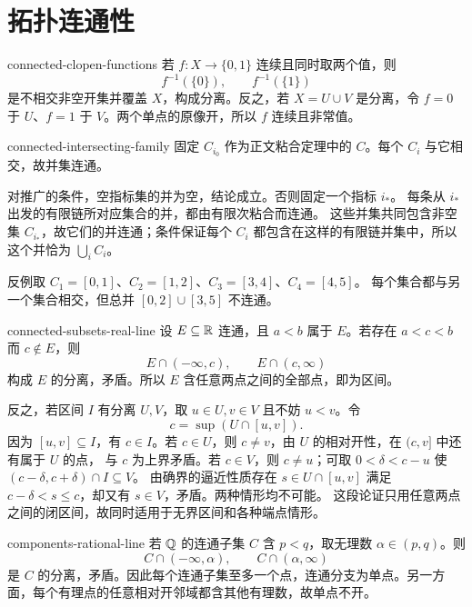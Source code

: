 \chapter{拓扑连通性}
\label{chap:topological-connectedness-solutions}

\begin{solution}{connected-clopen-functions}
若 \(f:X\to\{0,1\}\) 连续且同时取两个值，则
\[
 f^{-1}(\{0\}),\qquad f^{-1}(\{1\})
\]
是不相交非空开集并覆盖 \(X\)，构成分离。反之，若 \(X=U\cup V\) 是分离，令 \(f=0\) 于 \(U\)、\(f=1\) 于 \(V\)。两个单点的原像开，所以 \(f\) 连续且非常值。
\end{solution}

\begin{solution}{connected-intersecting-family}
固定 \(C_{i_0}\) 作为正文粘合定理中的 \(C\)。每个 \(C_i\) 与它相交，故并集连通。

对推广的条件，空指标集的并为空，结论成立。否则固定一个指标 \(i_*\)。
每条从 \(i_*\) 出发的有限链所对应集合的并，都由有限次粘合而连通。
这些并集共同包含非空集 \(C_{i_*}\)，故它们的并连通；条件保证每个
\(C_i\) 都包含在这样的有限链并集中，所以这个并恰为 \(\bigcup_iC_i\)。

反例取 \(C_1=[0,1]\)、\(C_2=[1,2]\)、\(C_3=[3,4]\)、\(C_4=[4,5]\)。
每个集合都与另一个集合相交，但总并 \([0,2]\cup[3,5]\) 不连通。
\end{solution}

\begin{solution}{connected-subsets-real-line}
设 \(E\subseteq\mathbb{R}\) 连通，且 \(a<b\) 属于 \(E\)。若存在 \(a<c<b\) 而 \(c\notin E\)，则
\[
 E\cap(-\infty,c),\qquad E\cap(c,\infty)
\]
构成 \(E\) 的分离，矛盾。所以 \(E\) 含任意两点之间的全部点，即为区间。

反之，若区间 \(I\) 有分离 \(U,V\)，取 \(u\in U,v\in V\) 且不妨 \(u<v\)。令
\[
 c=\sup(U\cap[u,v]).
\]
因为 \([u,v]\subseteq I\)，有 \(c\in I\)。若 \(c\in U\)，则
\(c\ne v\)，由 \(U\) 的相对开性，在 \((c,v]\) 中还有属于 \(U\) 的点，
与 \(c\) 为上界矛盾。若 \(c\in V\)，则 \(c\ne u\)；可取
\(0<\delta<c-u\) 使 \((c-\delta,c+\delta)\cap I\subseteq V\)。
由确界的逼近性质存在 \(s\in U\cap[u,v]\) 满足
\(c-\delta<s\le c\)，却又有 \(s\in V\)，矛盾。两种情形均不可能。
这段论证只用任意两点之间的闭区间，故同时适用于无界区间和各种端点情形。
\end{solution}

\begin{solution}{components-rational-line}
若 \(\mathbb{Q}\) 的连通子集 \(C\) 含 \(p<q\)，取无理数 \(\alpha\in(p,q)\)。则
\[
 C\cap(-\infty,\alpha),\qquad C\cap(\alpha,\infty)
\]
是 \(C\) 的分离，矛盾。因此每个连通子集至多一个点，连通分支为单点。另一方面，每个有理点的任意相对开邻域都含其他有理数，故单点不开。
\end{solution}

